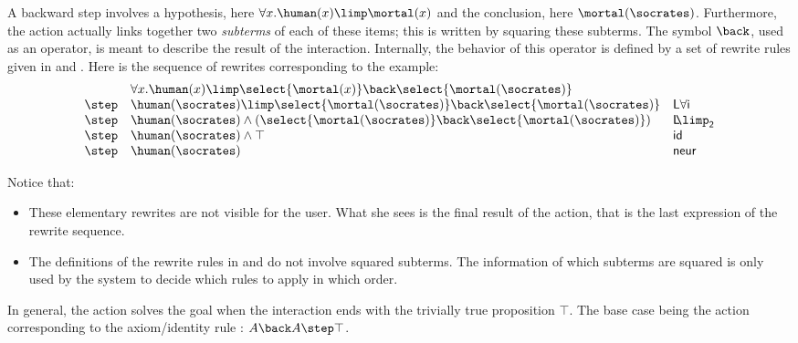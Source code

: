 A backward step involves a hypothesis, here $\forall x.\-\human(x)
\allowbreak\limp \mortal(x)$ and the conclusion, here $\mortal(\socrates)$.
Furthermore, the action actually links together two {\em subterms} of each of
these items; this is written by squaring these subterms. The symbol ${\back}$,
used as an operator, is meant to describe the result of the interaction.
Internally, the behavior of this operator is defined by a set of rewrite rules
given in  and . Here is the sequence of
rewrites corresponding to the example: \renewcommand{\arraystretch}{1.1}
$$\begin{array}{lll}
    &  \forall x.\human(x)\limp \select{\mortal(x)} \back \select{\mortal(\socrates)}&\\
    \step &
           \human(\socrates)\limp \select{\mortal(\socrates)}
           \back \select{\mortal(\socrates)}&
                                               \mathsf{L\forall i}\\
    \step &
           \human(\socrates)\land(\select{\mortal(\socrates)}
           \back \select{\mortal(\socrates)}) &
                                                 \mathsf{L\!\!\limp_2}\\
    \step &  \human(\socrates)\land \top &
                                           \mathsf{id}\\
    \step & \human(\socrates)&\mathsf{neur}\\
  \end{array}$$

Notice that:
\begin{itemize}
\item   These elementary rewrites are not visible for the user. What she sees is
  the final result of the action, that is the last expression of the rewrite
  sequence.
\item The definitions of the rewrite rules in  and
   do not involve squared subterms. The information of which
  subterms are squared is only used by the system to decide which rules to
  apply in which order.
\end{itemize}

In general, the action solves the goal when the interaction ends with
the trivially true proposition $\top$. The base case being the action
corresponding to the axiom/identity rule : $A\back A \step\top$.

